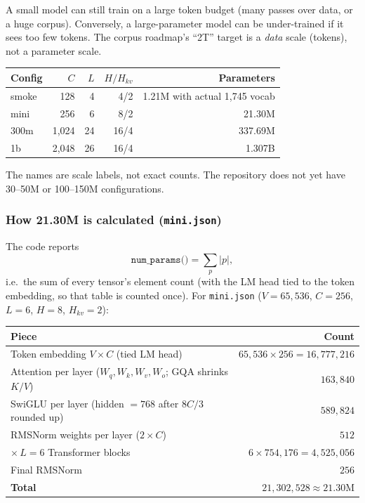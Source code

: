 A small model can still train on a large token budget (many passes over
data, or a huge corpus). Conversely, a large-parameter model can be
under-trained if it sees too few tokens. The corpus roadmap's ``2T'' target
is a \emph{data} scale (tokens), not a parameter scale.

\begin{center}
  \renewcommand{\arraystretch}{1.2}
  \begin{tabular}{@{}l r r r r@{}}
    \textbf{Config} & \(C\) & \(L\) & \(H/H_{kv}\) & \textbf{Parameters} \\
    \hline
    smoke & 128 & 4 & 4/2 & 1.21M with actual 1{,}745 vocab \\
    mini & 256 & 6 & 8/2 & 21.30M \\
    300m & 1{,}024 & 24 & 16/4 & 337.69M \\
    1b & 2{,}048 & 26 & 16/4 & 1.307B
  \end{tabular}
\end{center}

The names are scale labels, not exact counts. The repository does not yet have
30--50M or 100--150M configurations.

\subsubsection{How 21.30M is calculated (\texttt{mini.json})}

The code reports
\[
  \texttt{num\_params()}
  =\sum_p |p|,
\]
i.e.\ the sum of every tensor's element count (with the LM head tied to the
token embedding, so that table is counted once). For
\texttt{mini.json} (\(V{=}65{,}536\), \(C{=}256\), \(L{=}6\),
\(H{=}8\), \(H_{kv}{=}2\)):

\begin{center}
  \renewcommand{\arraystretch}{1.15}
  \small
  \begin{tabular}{@{}p{}r@{}}
    \textbf{Piece} & \textbf{Count} \\
    \hline
    Token embedding \(V\times C\)
      (tied LM head) &
    \(65{,}536\times 256=16{,}777{,}216\) \\
    Attention per layer
      (\(W_q,W_k,W_v,W_o\); GQA shrinks \(K/V\)) &
    \(163{,}840\) \\
    SwiGLU per layer
      (hidden \(=768\) after \(8C/3\) rounded up) &
    \(589{,}824\) \\
    RMSNorm weights per layer (\(2\times C\)) &
    \(512\) \\
    \(\times\,L{=}6\) Transformer blocks &
    \(6\times 754{,}176=4{,}525{,}056\) \\
    Final RMSNorm & \(256\) \\
    \hline
    \textbf{Total} &
    \(21{,}302{,}528\approx 21.30\text{M}\)
  \end{tabular}
\end{center}

